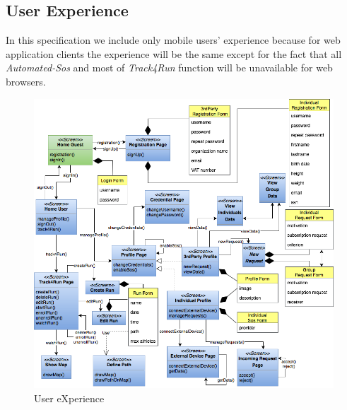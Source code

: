 \documentclass[a4paper]{article}
\begin{document}
\subsection{User Experience}
    In this specification we include only mobile users' experience because for web application clients the experience will be the same except for the fact that all \textit{Automated-Sos} and most of \textit{Track4Run} function will be unavailable for web browsers.
    \begin{figure}[!htpb]
    	\centering
    	\includegraphics[width=\textwidth]{images/ux/UX_TrackMe.png}
    	\caption{User eXperience}
    \end{figure}

\newpage
\end{document}
